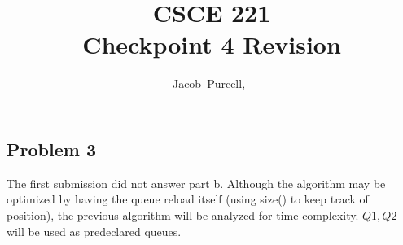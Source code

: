 \documentclass[journal]{IEEEtran}
\begin{document}
\title{CSCE 221 \\ Checkpoint 4 Revision}

\author{Jacob~Purcell,~}

\maketitle


\subsection*{Problem 3}

The first submission did not answer part b. Although the algorithm may be optimized by having
the queue reload itself (using size() to keep track of position), the previous algorithm will be analyzed for 
time complexity. $Q1, Q2$ will be used as predeclared queues.
\end{document}
